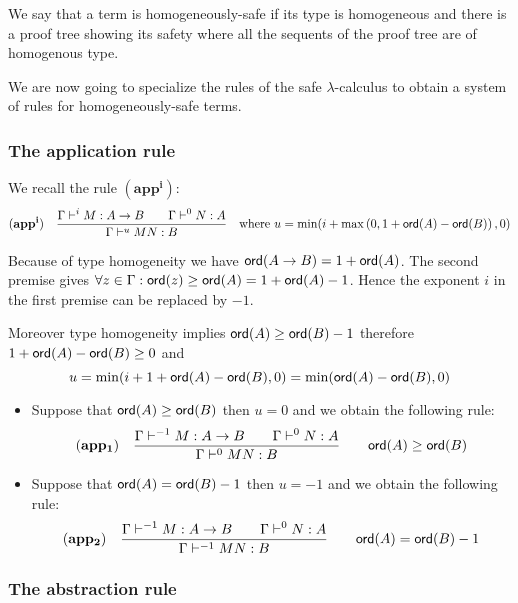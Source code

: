 We say that a term is homogeneously-safe if its type is homogeneous
and there is a proof tree showing its safety where all the sequents
of the proof tree are of homogenous type.

We are now going to specialize the rules of the safe
$\lambda$-calculus to obtain a system of rules for
homogeneously-safe terms.

\subsubsection{The application rule}
We recall the rule $\mathbf{(app^i)}$:
$$
 \mathbf{(app^i)} \quad  \frac{\displaystyle \Gamma \vdash^i M : A\rightarrow B
                                        \qquad \Gamma \vdash^{0} N : A}{\Gamma  \vdash^{u} M N : B}
\quad \mbox{where } u = \min(i+\max\left(0, 1 + {\sf ord}(A) -
{\sf ord}(B)\right),0)
$$

Because of type homogeneity we have ${\sf ord}(A\rightarrow B ) = 1 +
{\sf ord}(A)$. The second premise gives $\forall z \in \Gamma : {\sf ord}(z)
\geq {\sf ord}(A) = 1 + {\sf ord}(A) - 1$. Hence the exponent $i$ in the first
premise can be replaced by $-1$.


Moreover type homogeneity implies ${\sf ord}(A) \geq {\sf ord}(B)-1$ therefore
$1 + {\sf ord}(A) - {\sf ord}(B) \geq 0$ and
$$ u = \min(i+1 + {\sf ord}(A) - {\sf ord}(B),0) = \min({\sf ord}(A) - {\sf ord}(B),0)$$

\begin{itemize}
\item Suppose that ${\sf ord}(A) \geq {\sf ord}(B)$ then $u=0$ and we obtain the following rule:
$$ \mathbf{(app_1)} \quad  \frac{\displaystyle \Gamma \vdash^{-1} M : A\rightarrow B
                                        \qquad \Gamma \vdash^{0} N : A }{\Gamma  \vdash^{0} M N : B}
                                    \qquad {\sf ord}(A) \geq {\sf ord}(B)$$

\item Suppose that ${\sf ord}(A) = {\sf ord}(B) - 1$ then
$ u = -1$ and we obtain the following rule:
$$ \mathbf{(app_2)} \quad  \frac{\displaystyle \Gamma \vdash^{-1} M : A\rightarrow B
                                        \qquad \Gamma \vdash^{0} N : A
                                   }{\Gamma  \vdash^{-1} M N : B}
                                    \qquad {\sf ord}(A) = {\sf ord}(B) - 1$$
\end{itemize}



\subsubsection{The abstraction rule}

